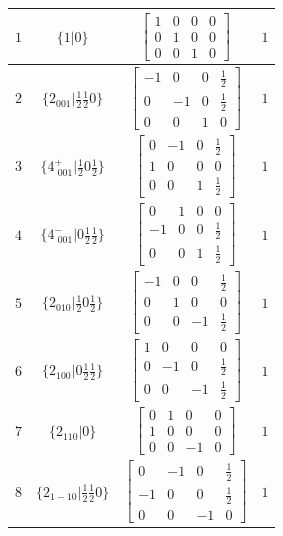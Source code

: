 \documentclass[fleqn,8pt]{jsarticle}
\begin{document}
\begin{longtable}{cccc}
$ 1 $ & $ \{1|0\} $ & $ \begin{bmatrix} 1 & 0 & 0 & 0 \\ 0 & 1 & 0 & 0 \\ 0 & 0 & 1 & 0 \end{bmatrix} $ & $ 1 $ \\ \hline
$ 2 $ & $ \{2{}_{001}|\frac{1}{2} \frac{1}{2} 0\} $ & $ \begin{bmatrix} -1 & 0 & 0 & \frac{1}{2} \\ 0 & -1 & 0 & \frac{1}{2} \\ 0 & 0 & 1 & 0 \end{bmatrix} $ & $ 1 $ \\ \hline
$ 3 $ & $ \{4^{+}_{\,\,001}|\frac{1}{2} 0 \frac{1}{2}\} $ & $ \begin{bmatrix} 0 & -1 & 0 & \frac{1}{2} \\ 1 & 0 & 0 & 0 \\ 0 & 0 & 1 & \frac{1}{2} \end{bmatrix} $ & $ 1 $ \\ \hline
$ 4 $ & $ \{4^{-}_{\,\,001}|0 \frac{1}{2} \frac{1}{2}\} $ & $ \begin{bmatrix} 0 & 1 & 0 & 0 \\ -1 & 0 & 0 & \frac{1}{2} \\ 0 & 0 & 1 & \frac{1}{2} \end{bmatrix} $ & $ 1 $ \\ \hline
$ 5 $ & $ \{2{}_{010}|\frac{1}{2} 0 \frac{1}{2}\} $ & $ \begin{bmatrix} -1 & 0 & 0 & \frac{1}{2} \\ 0 & 1 & 0 & 0 \\ 0 & 0 & -1 & \frac{1}{2} \end{bmatrix} $ & $ 1 $ \\ \hline
$ 6 $ & $ \{2{}_{100}|0 \frac{1}{2} \frac{1}{2}\} $ & $ \begin{bmatrix} 1 & 0 & 0 & 0 \\ 0 & -1 & 0 & \frac{1}{2} \\ 0 & 0 & -1 & \frac{1}{2} \end{bmatrix} $ & $ 1 $ \\ \hline
$ 7 $ & $ \{2{}_{110}|0\} $ & $ \begin{bmatrix} 0 & 1 & 0 & 0 \\ 1 & 0 & 0 & 0 \\ 0 & 0 & -1 & 0 \end{bmatrix} $ & $ 1 $ \\ \hline
$ 8 $ & $ \{2{}_{1-10}|\frac{1}{2} \frac{1}{2} 0\} $ & $ \begin{bmatrix} 0 & -1 & 0 & \frac{1}{2} \\ -1 & 0 & 0 & \frac{1}{2} \\ 0 & 0 & -1 & 0 \end{bmatrix} $ & $ 1 $ \\ \hline

\end{longtable}
\end{document}
